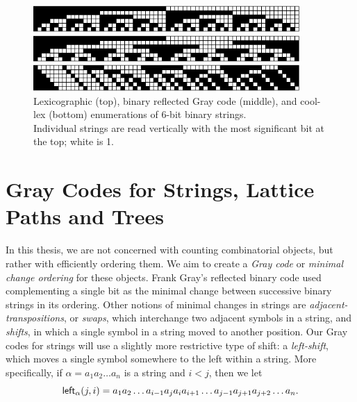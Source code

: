 \begin{figure}
    \centering
\includegraphics[width=4in]{BLX6-cropped.pdf} 

\includegraphics[width=4in]{BRGC6-cropped.pdf} 

\includegraphics[width=4in]{BCLX6-cropped.pdf} 

    \caption{Lexicographic (top), binary reflected Gray code (middle), and cool-lex (bottom) enumerations of 6-bit binary strings. \\ 
    Individual strings are read vertically with the most significant bit at the top; white is 1.
    }
    \label{binary}
\end{figure}

\section{Gray Codes for Strings, Lattice Paths and Trees}
In this thesis, we are not concerned with counting combinatorial objects, but rather with efficiently ordering them.  We aim to create a \emph{Gray code} or \emph{minimal change ordering} for these objects.  Frank Gray's reflected binary code used complementing a single bit as the minimal change between successive binary strings in its ordering.  Other notions of minimal changes in strings are \emph{adjacent-transpositions}, or \emph{swaps}, which interchange two adjacent symbols in a string, and \emph{shifts}, in which a single symbol in a string moved to another position. Our Gray codes for strings will use a slightly more restrictive type of shift: a \emph{left-shift}, which moves a single symbol somewhere to the left within a string. 
More specifically, if $\alpha = a_1 a_2 \ldots a_n$ is a string and $i < j$, then we let
\begin{equation*}
\leftshift[\alpha]{j}{i} = a_1 a_2 \ldots a_{i-1} a_j a_{i} a_{i+1} \ldots a_{j-1} a_{j+1} a_{j+2} \ldots a_n.
\end{equation*}

